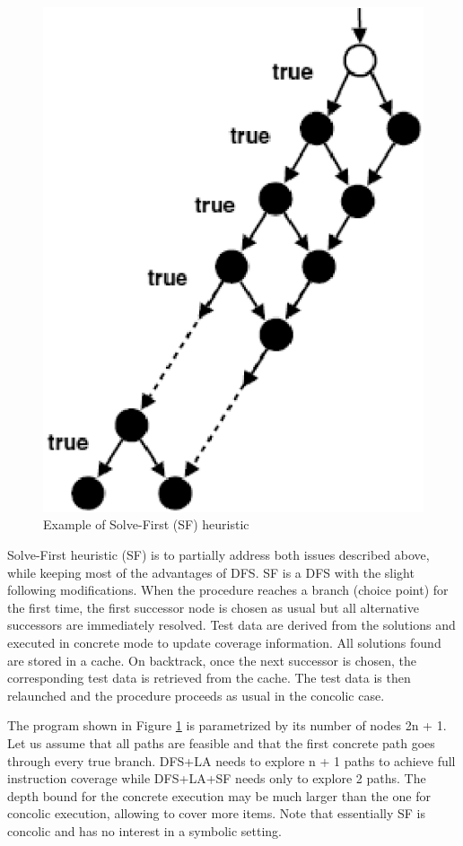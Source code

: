 \begin{figure}
\centering
\includegraphics[scale=0.6,clip]{fig/sf.eps} 
\caption{\label{fig:sf}Example of Solve-First (SF) heuristic} 
\end{figure}

Solve-First heuristic (SF) is to partially address both issues described above, while keeping most of the advantages of DFS. SF is a DFS with the slight following modifications. When the procedure reaches a branch (choice point) for the first time, the first successor node is chosen as usual but all alternative successors are immediately resolved. Test data are derived from the solutions and executed in concrete mode to update coverage information. All solutions found are stored in a cache. On backtrack, once the next successor is chosen, the corresponding test
data is retrieved from the cache. The test data is then relaunched and the procedure proceeds as usual in the concolic case.

The program shown in Figure \ref{fig:sf} is parametrized by its number of nodes 2n + 1. Let us assume that all paths are feasible and that the first concrete path goes through every true branch. DFS+LA needs to explore n + 1 paths to achieve full instruction coverage while DFS+LA+SF
needs only to explore 2 paths. The depth bound for the concrete execution may be much larger than the one for concolic execution, allowing to cover more items. Note that essentially SF is concolic and has no interest in a symbolic setting.


